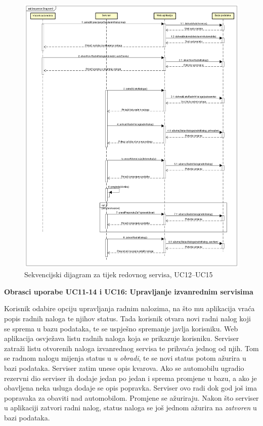 	\begin{figure}[H]
		\includegraphics[width=\linewidth]{dijagrami/seq-dia1.png}
		\centering
		\caption{Sekvencijski dijagram za tijek redovnog servisa, UC12--UC15}
		\label{fig:sequence-diagram1}
	\end{figure}

\eject


\noindent \textbf{Obrasci uporabe UC11-14 i UC16: Upravljanje izvanrednim servisima}

\noindent Korisnik odabire opciju upravljanja radnim nalozima, na što mu aplikacija vraća popis radnih naloga te njihov status. Tada korisnik otvara novi radni nalog koji se sprema u bazu podataka, te se uspješno spremanje javlja korisniku. Web aplikacija osvježava listu radnih naloga koja se prikazuje korisniku. Serviser zatraži listu otvorenih naloga izvanrednog servisa te prihvaća jednog od njih. Tom se radnom nalogu mijenja status u \textit{u obradi}, te se novi status potom ažurira u bazi podataka. Serviser zatim unese opis kvarova. Ako se automobilu ugradio rezervni dio serviser ih dodaje jedan po jedan i sprema promjene u bazu, a ako je obavljena neka usluga dodaje se opis popravka. Serviser ovo radi dok god još ima popravaka za obaviti nad automobilom. Promjene se ažuriraju. Nakon što serviser u aplikaciji zatvori radni nalog, status naloga se još jednom ažurira na \textit{zatvoren} u bazi podataka.

